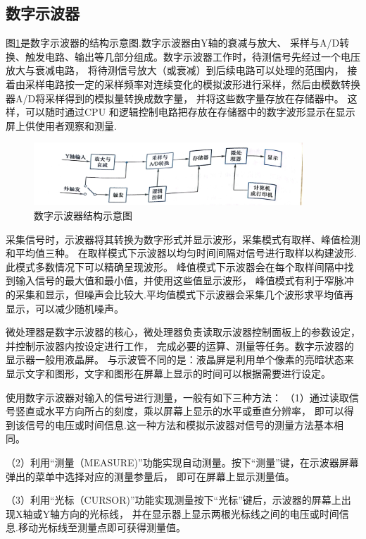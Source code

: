 \documentclass{ctexart}
\begin{document}
  \subsection{数字示波器}
  图\ref{shuzishiboqi}是数字示波器的结构示意图.数字示波器由Y轴的衰减与放大、
  采样与A/D转换、触发电路、输出等几部分组成。数字示波器工作时，待测信号先经过一个电压放大与衰减电路，
  将待测信号放大（或衰减）到后续电路可以处理的范围内，
  接着由采样电路按一定的采样频率对连续变化的模拟波形进行采样，然后由模数转换器A/D将采样得到的模拟量转换成数字量，
  并将这些数字量存放在存储器中。
  这样，可以随时通过CPU 和逻辑控制电路把存放在存储器中的数字波形显示在显示屏上供使用者观察和测量.
  \begin{figure}[H]\label{shuzishiboqi}
    \centering
    \includegraphics[width=0.9\textwidth,height=0.4\textheight]{shuzishiboqi.jpg}
    \caption{数字示波器结构示意图}
  \end{figure}

  采集信号时，示波器将其转换为数字形式并显示波形，采集模式有取样、峰值检测和平均值三种。
  在取样模式下示波器以均匀时间间隔对信号进行取样以构建波形.此模式多数情况下可以精确呈现波形。
  峰值模式下示波器会在每个取样间隔中找到输入信号的最大值和最小值，并使用这些值显示波形，
  峰值模式有利于窄脉冲的采集和显示，但噪声会比较大.平均值模式下示波器会采集几个波形求平均值再显示，可以减少随机噪声。

  微处理器是数字示波器的核心，微处理器负责读取示波器控制面板上的参数设定，并控制示波器内按设定进行工作，
  完成必要的运算、测量等任务。数字示波器的显示器一般用液晶屏。
  与示波管不同的是：液晶屏是利用单个像素的亮暗状态来显示文字和图形，文字和图形在屏幕上显示的时间可以根据需要进行设定。
  
  使用数字示波器对输入的信号进行测量，一般有如下三种方法：
  （1）通过读取信号竖直或水平方向所占的刻度，乘以屏幕上显示的水平或垂直分辨率，
  即可以得到该信号的电压或时间信息.这一种方法和模拟示波器对信号的测量方法基本相同。

  （2）利用“测量（MEASURE)”功能实现自动测量。按下“测量”键，在示波器屏幕弹出的菜单中选择对应的测量参量后，
  即可在屏幕上显示测量值。

  （3）利用“光标（CURSOR)”功能实现测量按下“光标”键后，示波器的屏幕上出现X轴或Y轴方向的光标线，
  并在显示器上显示两根光标线之间的电压或时间信息.移动光标线至测量点即可获得测量值。
\end{document}
